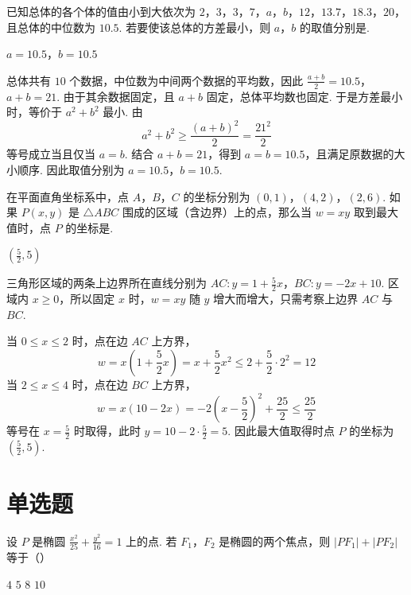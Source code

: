 \begin{problem}
已知总体的各个体的值由小到大依次为 \(2\)，\(3\)，\(3\)，\(7\)，\(a\)，\(b\)，\(12\)，\(13.7\)，\(18.3\)，\(20\)，且总体的中位数为 \(10.5\). 若要使该总体的方差最小，则 \(a\)，\(b\) 的取值分别是\fillinblank{}.
\end{problem}

\begin{answer}
\(a=10.5\)，\(b=10.5\)
\end{answer}

\begin{solution}
总体共有 \(10\) 个数据，中位数为中间两个数据的平均数，因此
\(\frac{a+b}{2}=10.5\)，\(a+b=21\).
由于其余数据固定，且 \(a+b\) 固定，总体平均数也固定. 于是方差最小时，等价于 \(a^2+b^2\) 最小. 由
\[
a^2+b^2\geqslant\frac{(a+b)^2}{2}=\frac{21^2}{2}
\]
等号成立当且仅当 \(a=b\). 结合 \(a+b=21\)，得到 \(a=b=10.5\)，且满足原数据的大小顺序. 因此取值分别为 \(a=10.5\)，\(b=10.5\).
\end{solution}

\begin{problem}
在平面直角坐标系中，点 \(A\)，\(B\)，\(C\) 的坐标分别为 \((0,1)\)，\((4,2)\)，\((2,6)\). 如果 \(P(x,y)\) 是 \(\triangle ABC\) 围成的区域（含边界）上的点，那么当 \(w = xy\) 取到最大值时，点 \(P\) 的坐标是\fillinblank{}.
\end{problem}

\begin{answer}
\(\left(\frac{5}{2},5\right)\)
\end{answer}

\begin{solution}
三角形区域的两条上边界所在直线分别为
\(AC:y=1+\frac52x\)，\(BC:y=-2x+10\).
区域内 \(x\geqslant0\)，所以固定 \(x\) 时，\(w=xy\) 随 \(y\) 增大而增大，只需考察上边界 \(AC\) 与 \(BC\).

当 \(0\leqslant x\leqslant2\) 时，点在边 \(AC\) 上方界，
\[
w=x\left(1+\frac52x\right)=x+\frac52x^2\leqslant2+\frac52\cdot2^2=12
\]
当 \(2\leqslant x\leqslant4\) 时，点在边 \(BC\) 上方界，
\[
w=x(10-2x)=-2\left(x-\frac52\right)^2+\frac{25}{2}\leqslant\frac{25}{2}
\]
等号在 \(x=\frac52\) 时取得，此时 \(y=10-2\cdot\frac52=5\). 因此最大值取得时点 \(P\) 的坐标为 \(\left(\frac52,5\right)\).
\end{solution}

\section{单选题}

\begin{problem}
设 \(P\) 是椭圆 \(\frac{x^2}{25} + \frac{y^2}{16} = 1\) 上的点. 若 \(F_1\)，\(F_2\) 是椭圆的两个焦点，则 \(\left|PF_1\right| + \left|PF_2\right|\) 等于（\quad）

\choices
    {\(4\)}
    {\(5\)}
    {\(8\)}
    {\(10\)}
\end{problem}

